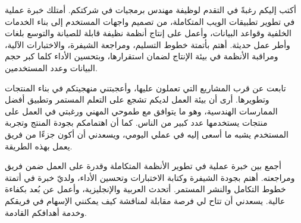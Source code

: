 \begin{letterbody}


أكتب إليكم رغبةً في التقدم لوظيفة مهندس برمجيات في شركتكم. أمتلك خبرة عملية في
تطوير تطبيقات الويب المتكاملة، من تصميم واجهات المستخدم إلى بناء الخدمات
الخلفية وقواعد البيانات، وأعمل على إنتاج أنظمة نظيفة قابلة للصيانة والتوسع
بلغات وأطر عمل حديثة. أهتم بأتمتة خطوط التسليم، ومراجعة الشيفرة، والاختبارات
الآلية، ومراقبة الأنظمة في بيئة الإنتاج لضمان استقرارها، وبتحسين الأداء كلما
كبر حجم البيانات وعدد المستخدمين.


تابعت عن قرب المشاريع التي تعملون عليها، وأعجبتني منهجيتكم في بناء المنتجات
وتطويرها. أرى أن بيئة العمل لديكم تشجع على التعلم المستمر وتطبيق أفضل الممارسات
الهندسية، وهو ما يتوافق مع طموحي المهني ورغبتي في العمل على منتجات يستخدمها
عدد كبير من الناس. كما أن اهتمامكم بجودة المنتج وتجربة المستخدم يشبه ما أسعى
إليه في عملي اليومي، ويسعدني أن أكون جزءًا من فريق يعمل بهذه الطريقة.


أجمع بين خبرة عملية في تطوير الأنظمة المتكاملة وقدرة على العمل ضمن فريق
ومراجعته. أهتم بجودة الشيفرة وكتابة الاختبارات وتحسين الأداء، ولديّ خبرة في
أتمتة خطوط التكامل والنشر المستمر. أتحدث العربية والإنجليزية، وأعمل عن بُعد
بكفاءة عالية. يسعدني أن تتاح لي فرصة مقابلة لمناقشة كيف يمكنني الإسهام في
فريقكم وخدمة أهدافكم القادمة.

\end{letterbody}
